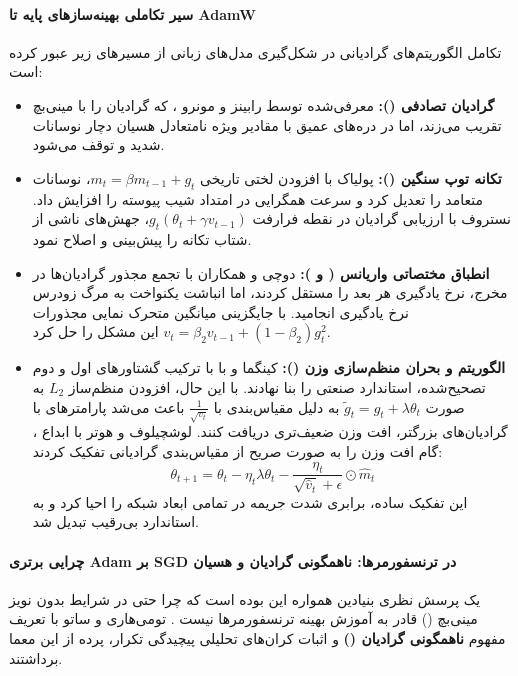\paragraph*{سیر تکاملی بهینه‌سازهای پایه تا AdamW}
تکامل الگوریتم‌های گرادیانی در شکل‌گیری مدل‌های زبانی از مسیرهای زیر عبور کرده است:
\begin{itemize}
    \item \textbf{گرادیان تصادفی ():} معرفی‌شده توسط رابینز و مونرو \cite{robbins1951stochastic}، که گرادیان را با مینی‌بچ تقریب می‌زند، اما در دره‌های عمیق با مقادیر ویژه نامتعادل هسیان دچار نوسانات شدید و توقف می‌شود.
    \item \textbf{تکانه توپ سنگین ():} پولیاک \cite{polyak1964some} با افزودن لختی تاریخی $m_t = \beta m_{t-1} + g_t$، نوسانات متعامد را تعدیل کرد و سرعت همگرایی در امتداد شیب پیوسته را افزایش داد. نستروف \cite{nesterov1983method} با ارزیابی گرادیان در نقطه فرارفت $g_t(\theta_t + \gamma v_{t-1})$، جهش‌های ناشی از شتاب تکانه را پیش‌بینی و اصلاح نمود.
    \item \textbf{انطباق مختصاتی واریانس ( و ):} دوچی و همکاران \cite{duchi2011adaptive} با تجمع مجذور گرادیان‌ها در مخرج، نرخ یادگیری هر بعد را مستقل کردند، اما انباشت یکنواخت به مرگ زودرس نرخ یادگیری انجامید.  \cite{tieleman2012rmsprop} با جایگزینی میانگین متحرک نمایی مجذورات $v_t = \beta_2 v_{t-1} + (1-\beta_2)g_t^2$ این مشکل را حل کرد.
    \item \textbf{الگوریتم  و بحران منظم‌سازی وزن ():} کینگما و با \cite{kingma2015adam} با ترکیب گشتاورهای اول و دوم تصحیح‌شده، استاندارد صنعتی را بنا نهادند. با این حال، افزودن منظم‌ساز $L_2$ به صورت $\tilde{g}_t = g_t + \lambda \theta_t$ به دلیل مقیاس‌بندی با $\frac{1}{\sqrt{v_t}}$ باعث می‌شد پارامترهای با گرادیان‌های بزرگتر، افت وزن ضعیف‌تری دریافت کنند. لوشچیلوف و هوتر \cite{loshchilov2019decoupled} با ابداع ، گام افت وزن را به صورت صریح از مقیاس‌بندی گرادیانی تفکیک کردند:
    \begin{equation}
        \theta_{t+1} = \theta_t - \eta_t \lambda \theta_t - \frac{\eta_t}{\sqrt{\hat{v}_t} + \epsilon} \odot \hat{m}_t
    \end{equation}
    این تفکیک ساده، برابری شدت جریمه در تمامی ابعاد شبکه را احیا کرد و به استاندارد بی‌رقیب تبدیل شد.
\end{itemize}

\paragraph*{چرایی برتری Adam بر SGD در ترنسفورمرها: ناهمگونی گرادیان و هسیان}
یک پرسش نظری بنیادین همواره این بوده است که چرا  حتی در شرایط بدون نویز مینی‌بچ () قادر به آموزش بهینه ترنسفورمرها نیست \cite{kunstner2023noise}. تومی‌هاری و ساتو \cite{tomihari2026understanding} با تعریف مفهوم \textbf{ناهمگونی گرادیان ()} و اثبات کران‌های تحلیلی پیچیدگی تکرار، پرده از این معما برداشتند.

